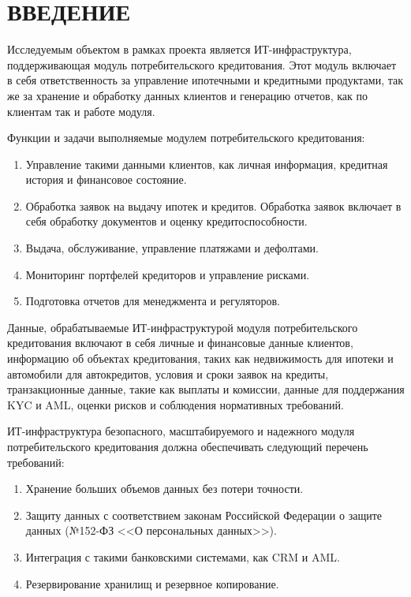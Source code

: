 \documentclass[14pt, a4paper]{extarticle}
\begin{document}
\def\contentsname{СОДЕРЖАНИЕ}

\begin{titlepage}
  
  
\end{titlepage}
\setcounter{page}{7}
\tableofcontents

\section*{ВВЕДЕНИЕ}
{}

Исследуемым объектом в рамках проекта является ИТ-инфраструктура,
поддерживающая модуль потребительского кредитования. Этот модуль включает в
себя ответственность за управление ипотечными и кредитными продуктами, так же
за хранение и обработку данных клиентов и генерацию отчетов, как по клиентам
так и работе модуля.

Функции и задачи выполняемые модулем потребительского кредитования:
\begin{enumerate}
	\item Управление такими данными клиентов, как личная информация, кредитная
история и финансовое состояние.
	\item Обработка заявок на выдачу ипотек и кредитов. Обработка заявок включает
в себя обработку документов и оценку кредитоспособности.
	\item Выдача, обслуживание, управление платяжами и дефолтами.
	\item Мониторинг портфелей кредиторов и управление рисками.
	\item Подготовка отчетов для менеджмента и регуляторов.
\end{enumerate}

Данные, обрабатываемые ИТ-инфраструктурой модуля потребительского кредитования
включают в себя личные и финансовые данные клиентов, информацию об объектах
кредитования, таких как недвижимость для ипотеки и автомобили для автокредитов,
условия и сроки заявок на кредиты, транзакционные данные, такие как выплаты и
комиссии, данные для поддержания KYC и AML, оценки рисков и соблюдения
нормативных требований.

ИТ-инфраструктура безопасного, масштабируемого и надежного модуля
потребительского кредитования должна обеспечивать следующий перечень
требований:

\begin{enumerate}
	\item Хранение больших объемов данных без потери точности.
	\item Защиту данных с соответствием законам Российской Федерации о защите
данных (№152-ФЗ <<О персональных данных>>).
	\item Интеграция с такими банковскими системами, как CRM и AML.
	\item Резервирование хранилищ и резервное копирование.
\end{enumerate}
\end{document}
